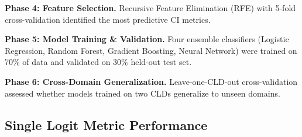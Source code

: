 \documentclass{article}
\begin{document}
\textbf{Phase 4: Feature Selection.} Recursive Feature Elimination (RFE) with 5-fold cross-validation identified the most predictive CI metrics.

\textbf{Phase 5: Model Training \& Validation.} Four ensemble classifiers (Logistic Regression, Random Forest, Gradient Boosting, Neural Network) were trained on 70\% of data and validated on 30\% held-out test set.

\textbf{Phase 6: Cross-Domain Generalization.} Leave-one-CLD-out cross-validation assessed whether models trained on two CLDs generalize to unseen domains.

\subsection{Single Logit Metric Performance}
\end{document}
